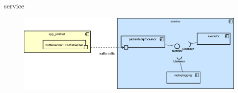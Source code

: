 \begin{frame}{service}
    \begin{figure}
    	\centering
    	\includegraphics[width=\textwidth]{./images/service.png}
    \end{figure}
\end{frame}
